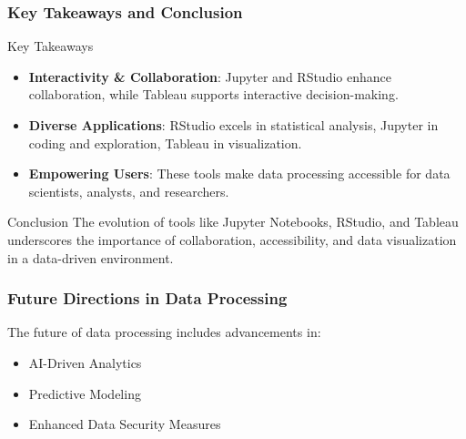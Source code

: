 \documentclass[aspectratio=169]{beamer}
\begin{document}
\begin{frame}[fragile]
    \frametitle{Key Takeaways and Conclusion}
    \begin{block}{Key Takeaways}
        \begin{itemize}
            \item \textbf{Interactivity \& Collaboration}: Jupyter and RStudio enhance collaboration, while Tableau supports interactive decision-making.
            \item \textbf{Diverse Applications}: RStudio excels in statistical analysis, Jupyter in coding and exploration, Tableau in visualization.
            \item \textbf{Empowering Users}: These tools make data processing accessible for data scientists, analysts, and researchers.
        \end{itemize}
    \end{block}
    \begin{block}{Conclusion}
        The evolution of tools like Jupyter Notebooks, RStudio, and Tableau underscores the importance of collaboration, accessibility, and data visualization in a data-driven environment.
    \end{block}
\end{frame}

\begin{frame}[fragile]
    \frametitle{Future Directions in Data Processing}
    The future of data processing includes advancements in:
    \begin{itemize}
        \item AI-Driven Analytics
        \item Predictive Modeling
        \item Enhanced Data Security Measures
    \end{itemize}
\end{frame}
\end{document}
